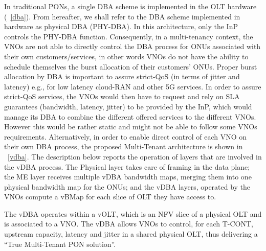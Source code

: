  In traditional \acp{PON}, a single \ac{DBA} scheme is implemented in the \ac{OLT} hardware (\figureautorefname~\ref{dba}). From hereafter, we shall refer to the \ac{DBA} scheme implemented in hardware as physical \ac{DBA} (PHY-\ac{DBA}). In this architecture, only the \ac{InP} controls the PHY-\ac{DBA} function. Consequently, in a multi-tenancy context, the \acp{VNO} are not able to directly control the \ac{DBA} process for \acp{ONU} associated with their own customers/services, in other words \acp{VNO} do not have the ability to schedule themselves the burst allocation of their customers' \acp{ONU}. Proper burst allocation by \ac{DBA} is important to assure strict-\ac{QoS} (in terms of jitter and latency) e.g., for low latency cloud-RAN and other \ac{5G} services. In order to assure strict-\ac{QoS} services, the \acp{VNO} would then have to request and rely on \ac{SLA} guarantees (bandwidth, latency, jitter) to be provided by the \ac{InP}, which would manage its \ac{DBA} to combine the different offered services to the different \acp{VNO}. However this would be rather static and might not be able to follow some \acp{VNO} requirements. Alternatively, in order to enable direct control of each \ac{VNO} on their own \ac{DBA} process, the proposed Multi-Tenant architecture is shown in \figureautorefname~\ref{vdba}. The description below reports the operation of layers that are involved in the \ac{vDBA} process. The Physical layer takes care of framing in the data plane; the \ac{ME} layer receives multiple \ac{vDBA} bandwidth maps, merging them into one physical bandwidth map for the \acp{ONU}; and the \ac{vDBA} layers, operated by the \acp{VNO} compute a \ac{vBMap} for each slice of \ac{OLT} they have access to.
 
  The \ac{vDBA} operates within a \ac{vOLT}, which is an NFV slice of a physical \ac{OLT} and is associated to a \ac{VNO}. The \ac{vDBA} allows \acp{VNO} to control, for each \ac{T-CONT}, upstream capacity, latency and jitter in a shared physical \ac{OLT}, thus delivering a “True Multi-Tenant \ac{PON} solution”. 
 
 





